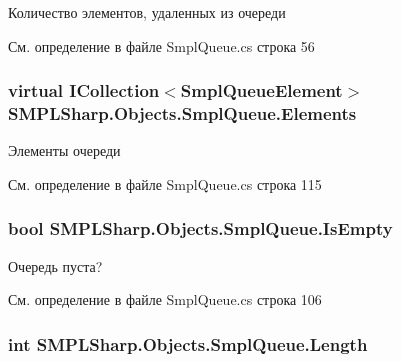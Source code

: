 Количество элементов, удаленных из очереди 



См. определение в файле Smpl\-Queue.\-cs строка 56

\hypertarget{class_s_m_p_l_sharp_1_1_objects_1_1_smpl_queue_a615e74aa9a4f6d4c82468cafcf20bc71}{
\subsubsection[{Elements}]{\setlength{\rightskip}{0pt plus 5cm}virtual I\-Collection$<${\bf Smpl\-Queue\-Element}$>$ S\-M\-P\-L\-Sharp.\-Objects.\-Smpl\-Queue.\-Elements\hspace{0.3cm}{\ttfamily [get]}}}\label{d3/ded/class_s_m_p_l_sharp_1_1_objects_1_1_smpl_queue_a615e74aa9a4f6d4c82468cafcf20bc71}


Элементы очереди 



См. определение в файле Smpl\-Queue.\-cs строка 115

\hypertarget{class_s_m_p_l_sharp_1_1_objects_1_1_smpl_queue_a740725209155ade0c50d3e259967dbd1}{
\subsubsection[{Is\-Empty}]{\setlength{\rightskip}{0pt plus 5cm}bool S\-M\-P\-L\-Sharp.\-Objects.\-Smpl\-Queue.\-Is\-Empty\hspace{0.3cm}{\ttfamily [get]}}}\label{d3/ded/class_s_m_p_l_sharp_1_1_objects_1_1_smpl_queue_a740725209155ade0c50d3e259967dbd1}


Очередь пуста? 



См. определение в файле Smpl\-Queue.\-cs строка 106

\hypertarget{class_s_m_p_l_sharp_1_1_objects_1_1_smpl_queue_a90750620f30441f6df56f42072648e45}{
\subsubsection[{Length}]{\setlength{\rightskip}{0pt plus 5cm}int S\-M\-P\-L\-Sharp.\-Objects.\-Smpl\-Queue.\-Length\hspace{0.3cm}{\ttfamily [get]}}}\label{d3/ded/class_s_m_p_l_sharp_1_1_objects_1_1_smpl_queue_a90750620f30441f6df56f42072648e45}


